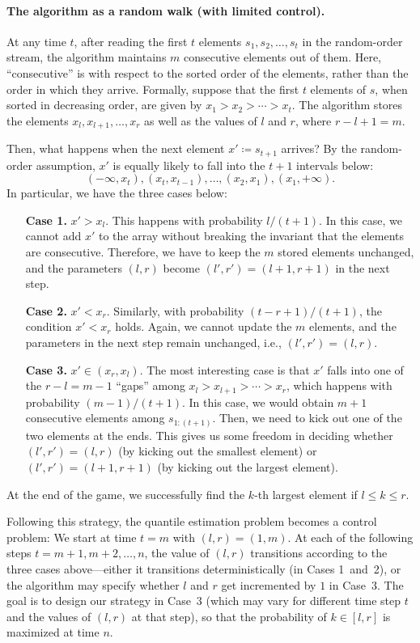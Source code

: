\paragraph{The algorithm as a random walk (with limited control).} At any time $t$, after reading the first $t$ elements $s_1, s_2, \ldots, s_t$ in the random-order stream, the algorithm maintains $m$ consecutive elements out of them. Here, ``consecutive'' is with respect to the sorted order of the elements, rather than the order in which they arrive. Formally, suppose that the first $t$ elements of $s$, when sorted in decreasing order, are given by $x_1 > x_2 > \cdots > x_t$. The algorithm stores the elements $x_l, x_{l+1}, \ldots, x_r$ as well as the values of $l$ and $r$, where $r - l + 1 = m$.

Then, what happens when the next element $x' \coloneqq s_{t+1}$ arrives? By the random-order assumption, $x'$ is equally likely to fall into the $t+1$ intervals below:
\[
    (-\infty, x_t), (x_t, x_{t-1}), \ldots, (x_2, x_1), (x_1, +\infty).
\]
In particular, we have the three cases below:
\begin{enumerate}
    \item[\textbf{Case 1.}] $x' > x_l$. This happens with probability $l / (t + 1)$. In this case, we cannot add $x'$ to the array without breaking the invariant that the elements are consecutive. Therefore, we have to keep the $m$ stored elements unchanged, and the parameters $(l, r)$ become $(l', r') = (l + 1, r + 1)$ in the next step.
    \item[\textbf{Case 2.}] $x' < x_r$. Similarly, with probability $(t - r + 1) / (t + 1)$, the condition $x' < x_r$ holds. Again, we cannot update the $m$ elements, and the parameters in the next step remain unchanged, i.e., $(l', r') = (l, r)$.
    \item[\textbf{Case 3.}] $x' \in (x_r, x_l)$. The most interesting case is that $x'$ falls into one of the $r - l = m-1$ ``gaps'' among $x_l > x_{l+1} > \cdots > x_r$, which happens with probability $(m - 1) / (t + 1)$. In this case, we would obtain $m + 1$ consecutive elements among $s_{1:(t+1)}$. Then, we need to kick out one of the two elements at the ends. This gives us some freedom in deciding whether $(l', r') = (l, r)$ (by kicking out the smallest element) or $(l', r') = (l + 1, r + 1)$ (by kicking out the largest element).
\end{enumerate} 
At the end of the game, we successfully find the $k$-th largest element if $l \le k \le r$.

Following this strategy, the quantile estimation problem becomes a control problem: We start at time $t = m$ with $(l, r) = (1, m)$. At each of the following steps $t = m + 1, m + 2, \ldots, n$, the value of $(l, r)$ transitions according to the three cases above---either it transitions deterministically (in Cases 1~and~2), or the algorithm may specify whether $l$ and $r$ get incremented by $1$ in Case~3. The goal is to design our strategy in Case~3 (which may vary for different time step $t$ and the values of $(l, r)$ at that step), so that the probability of $k \in [l, r]$ is maximized at time $n$.

